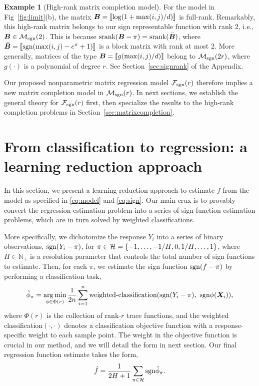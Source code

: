 \documentclass[11pt]{article}
\theoremstyle{plain}
\theoremstyle{definition}
\newtheorem{example}{Example}
\def\caliF{\tF_{\textup{sgn}}}
\def\caliM{\tM_{\textup{sgn}}}
\def\sign{\textup{sgn}}
\def\srank{\textup{srank}}
\def\caliF{\tF_{\textup{sgn}}}
\def\caliM{\tM_{\textup{sgn}}}
\begin{document}
\begin{example}[High-rank matrix completion model]\label{ex:high-rank}
For the model in Fig~\ref{fig:limit}(b), the matrix $\bm B=\llbracket \log(1+\max(i,j)/d) \rrbracket$ is full-rank. Remarkably, this high-rank matrix belongs to our sign representable function with rank 2, i.e., $\mB\in \caliM(2)$. This is because $\srank(\mB-\pi)=\srank(\bar \mB)$, where $\bar \mB=\entry{\sign(\max(i,j)-e^\pi+1)}$ is a block matrix with rank at most 2. More generally, matrices of the type $\bm B=\llbracket g(\max(i,j)/d) \rrbracket$ belong to $\caliM(2r)$, where $g(\cdot)$ is a polynomial of degree $r$. See Section~\ref{sec:signrank} of the Appendix.
\end{example}

Our proposed nonparametric matrix regression model $\caliF(r)$ therefore implies a new matrix completion model in $\caliM(r)$. In next sections, we establish the general theory for $\caliF(r)$ first, then specialize the results to the high-rank completion problems in Section~\ref{sec:matrixcompletion}. 





\section{From classification to regression: a learning reduction approach}
\label{sec:bridge}

In this section, we present a learning reduction approach to estimate $f$ from the model as specified in \eqref{eq:model} and \eqref{eq:sign}. Our main crux is to provably convert
the regression estimation problem into a series of sign function estimation problems, which are in turn solved by weighted classifications. 

More specifically, we dichotomize the response $Y_i$ into a series of binary observations, $\sign(Y_i-\pi)$, for $\pi\in\mathcal{H}=\{-1,\ldots,-{1/H}, 0, {1/H}, \ldots,1\}$, where $H\in\mathbb{N}_{+}$ is a resolution parameter that controls the total number of sign functions to estimate. Then, for each $\pi$, we estimate the sign function $\sign(f-\pi)$ by performing a classification task, 
\begin{equation}\label{eq:proposal}
\hat \phi_\pi =\argmin_{\phi\in\Phi(r)}{1\over 2n}\sum_{i=1}^n\text{weighted-classification}(\sign(Y_i-\pi),\ \sign \phi(\mX_i)),
\end{equation}
where $\Phi(r)$ is the collection of rank-$r$ trace functions, and the weighted classification$(\cdot,\cdot)$ denotes a classification objective function with a response-specific weight to each sample point. The weight in the objective function is crucial in our method, and we will detail the form in next section. Our final regression function estimate takes the form, 
\begin{equation}\label{eq:stepfunction}
\hat f= {1\over 2H+1}\sum_{\pi \in \tH} \sign \hat \phi_\pi.
\end{equation}
\end{document}
